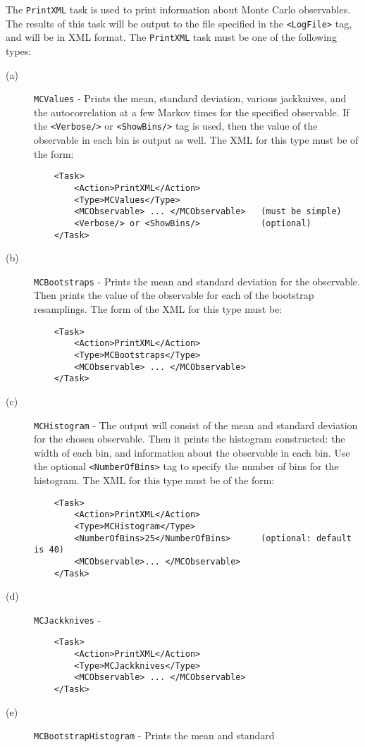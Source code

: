 \documentclass[12pt]{article}
\newcommand{\vb}{\texttt}
\begin{document}
The \vb{PrintXML} task is used to print information about Monte Carlo observables.
The results of this task will be output to the file specified in the
\vb{<LogFile>} tag, and will be in XML format.
The \vb{PrintXML} task must be one of the following types:
\begin{description}
\item[(a)] \vb{MCValues} - Prints the mean, standard deviation, various jackknives, and
  the autocorrelation at a few Markov times for the specified observable.
  If the \vb{<Verbose/>} or \vb{<ShowBins/>} tag is used, then the value of the observable in
  each bin is output as well. The XML for this type must be of the form:
\begin{verbatim}
    <Task>
        <Action>PrintXML</Action>
        <Type>MCValues</Type>
        <MCObservable> ... </MCObservable>   (must be simple)
        <Verbose/> or <ShowBins/>            (optional)
    </Task>
\end{verbatim}
\item[(b)] \vb{MCBootstraps} - Prints the mean and standard deviation for the observable.
  Then prints the value of the observable for each of the bootstrap resamplings.
  The form of the XML for this type must be:
\begin{verbatim}
    <Task>
        <Action>PrintXML</Action>
        <Type>MCBootstraps</Type>
        <MCObservable> ... </MCObservable>
    </Task>
\end{verbatim}
\item[(c)] \vb{MCHistogram} - The output will consist of the mean and standard deviation for the chosen
  observable. Then it prints the histogram constructed: the width of each bin, and information
  about the observable in each bin.
  Use the optional \vb{<NumberOfBins>} tag to specify the number of
  bins for the histogram. The XML for this type must be of the form:
\begin{verbatim}
    <Task>
        <Action>PrintXML</Action>
        <Type>MCHistogram</Type>
        <NumberOfBins>25</NumberOfBins>      (optional: default is 40)
        <MCObservable>... </MCObservable>
    </Task>
\end{verbatim}
\item[(d)] \vb{MCJackknives} -
\begin{verbatim}
    <Task>
        <Action>PrintXML</Action>
        <Type>MCJackknives</Type>
        <MCObservable> ... </MCObservable>
    </Task>
\end{verbatim}
\item[(e)] \vb{MCBootstrapHistogram} - Prints the mean and standard

\end{description}
\end{document}
